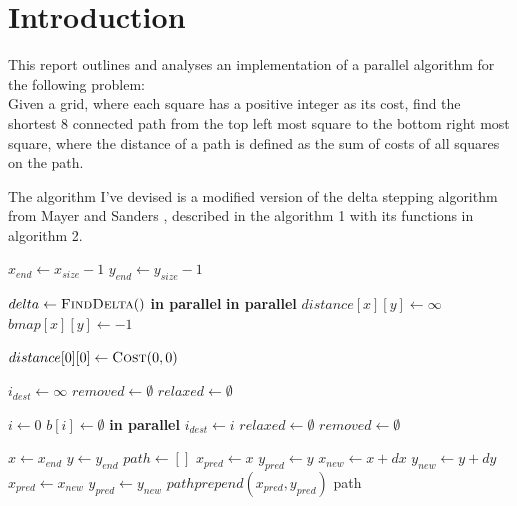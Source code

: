 \documentclass{article}
\begin{document}
\section*{Introduction}

This report outlines and analyses an implementation of a parallel algorithm for the following
problem:\\
Given a grid, where each square has a positive integer as its cost, find the shortest 8 connected
path from the top left most square to the bottom right most square, where the distance of a path is
defined as the sum of costs of all squares on the path.

The algorithm I've devised is a modified version of the delta stepping algorithm from Mayer and
Sanders \cite{Meyer-1998}, described in the algorithm 1 with its functions in algorithm 2.
\begin{algorithm}
	\caption{}
	\begin{algorithmic}[1]
		\State \(x_{end}\gets x_{size} - 1\)
		\State \(y_{end}\gets y_{size} - 1\)

		\State \(delta\gets \Call{FindDelta}{ }\)
		\textbf{ in parallel}
			\textbf{ in parallel}
				\State $distance[x][y] \gets \infty$
				\State $bmap[x][y] \gets -1$ 
			\EndFor
		\EndFor

		\State \(distance[0][0]\gets \Call{Cost}{0, 0}\)
		\State {}

		\State $i_{dest} \gets \infty$
		\State $removed \gets \emptyset$
		\State $relaxed \gets \emptyset$

		\State $i \gets 0$
				\State {}
				\State $b[i] \gets \emptyset$
				 \textbf{in parallel}
					\State {}
						\State $i_{dest} \gets i$
					\EndIf
				\EndFor
			\EndWhile
			\State $relaxed \gets \emptyset$
			\State $removed \gets \emptyset$
		\EndWhile

		\State $x \gets x_{end}$ 
		\State $y \gets y_{end}$
		\State $path \gets [ ]$
			\State $x_{pred} \gets x$
			\State $y_{pred} \gets y$
			\State $x_{new} \gets x + dx$
			\State $y_{new} \gets y + dy$
							\State $x_{pred} \gets x_{new}$
							\State $y_{pred} \gets y_{new}$
						\EndIf
					\EndIf
				\EndFor
			\EndFor
			\State $path prepend (x_{pred}, y_{pred})$
		\EndWhile
		\State \Return path
	\end{algorithmic}
\end{algorithm}
\end{document}

